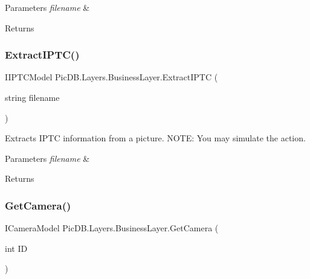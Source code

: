 \begin{DoxyParams}{Parameters}
{\em filename} & \\
\hline
\end{DoxyParams}
\begin{DoxyReturn}{Returns}

\end{DoxyReturn}
\mbox{\label{class_pic_d_b_1_1_layers_1_1_business_layer_a208feabb41bd4f7518208df696ccc9e5}} 
\subsubsection{\texorpdfstring{Extract\+I\+P\+T\+C()}{ExtractIPTC()}}
{\footnotesize\ttfamily I\+I\+P\+T\+C\+Model Pic\+D\+B.\+Layers.\+Business\+Layer.\+Extract\+I\+P\+TC (\begin{DoxyParamCaption}\item[{string}]{filename }\end{DoxyParamCaption})}



Extracts I\+P\+TC information from a picture. N\+O\+TE\+: You may simulate the action. 


\begin{DoxyParams}{Parameters}
{\em filename} & \\
\hline
\end{DoxyParams}
\begin{DoxyReturn}{Returns}

\end{DoxyReturn}
\mbox{\label{class_pic_d_b_1_1_layers_1_1_business_layer_a473f90240ca26a3aae42a4884f909a6b}} 
\subsubsection{\texorpdfstring{Get\+Camera()}{GetCamera()}}
{\footnotesize\ttfamily I\+Camera\+Model Pic\+D\+B.\+Layers.\+Business\+Layer.\+Get\+Camera (\begin{DoxyParamCaption}\item[{int}]{ID }\end{DoxyParamCaption})}




